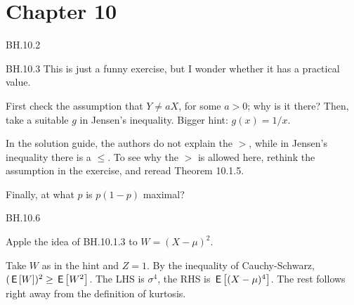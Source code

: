 


\chapter{Chapter 10}


\setcounter{theorem}{1}
\begin{exercise}
BH.10.2
\end{exercise}

\setcounter{theorem}{2}
\begin{exercise}
BH.10.3
This is just a funny exercise, but I wonder whether it has a practical value.
\begin{hint}
First check the assumption that $Y\neq a X$, for some $a>0$; why is it there?
Then, take a suitable $g$ in Jensen's inequality.
Bigger hint: $g(x)=1/x$.

In the solution guide, the authors do not explain the $>$, while in Jensen's inequality there is a $\leq$. To see why the $>$ is allowed here, rethink the assumption in the exercise, and reread Theorem 10.1.5.

Finally, at what $p$ is $p(1-p)$ maximal?
\end{hint}
\end{exercise}

\setcounter{theorem}{5}
\begin{exercise}
BH.10.6
\begin{hint}
Apple the idea of BH.10.1.3 to $W=(X-\mu)^2$.
\end{hint}
\begin{solution}
Take $W$ as in the hint and $Z=1$. By the inequality of Cauchy-Schwarz, $(\,\mathsf{E}\left[W\right])^2 \geq \,\mathsf{E}\left[W^2\right]$. The LHS is $\sigma^{4}$, the RHS is $\,\mathsf{E}\left[(X-\mu)^4\right]$. The rest  follows right away from the definition of kurtosis.
\end{solution}
\end{exercise}

